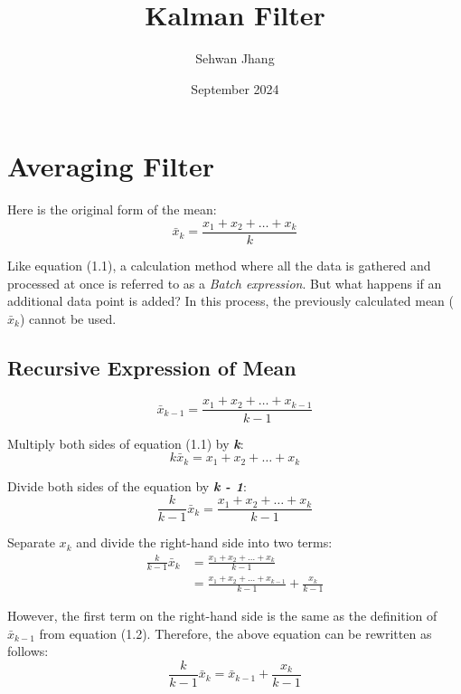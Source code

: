 \documentclass{article}
\title{Kalman Filter}
\author{Sehwan Jhang}
\date{September 2024}
\numberwithin{equation}{section} %
\begin{document}
\maketitle

\section{Averaging Filter}
Here is the original form of the mean:
\begin{equation}
    \bar{x}_k = \frac{x_1 + x_2 + \ldots + x_k}{k}
\end{equation}

Like equation (1.1), a calculation method where all the data is gathered and processed at once is referred to as a \textit{Batch expression}. But what happens if an additional data point is added? In this process, the previously calculated mean (\(\bar{x}_k\)) cannot be used.

\subsection{Recursive Expression of Mean}

\begin{equation}
    \bar{x}_{k-1} = \frac{x_1 + x_2 + \ldots + x_{k-1}}{k - 1}
\end{equation}

Multiply both sides of equation (1.1) by \textit{\textbf{k}}:
\begin{equation*}
    k \bar{x}_k = x_1 + x_2 + \ldots + x_k
\end{equation*}

Divide both sides of the equation by \textit{\textbf{k - 1}}:
\begin{equation*}
    \frac{k}{k-1} \bar{x}_k = \frac{x_1 + x_2 + \ldots + x_k}{k - 1}
\end{equation*}

Separate \( x_k \) and divide the right-hand side into two terms:
\begin{align*}
    \frac{k}{k-1} \bar{x}_k & = \frac{x_1 + x_2 + \ldots + x_k}{k - 1}                           \\
                            & = \frac{x_1 + x_2 + \ldots + x_{k - 1}}{k - 1} + \frac{x_k}{k - 1}
\end{align*}

However, the first term on the right-hand side is the same as the definition of \(\bar{x}_{k-1}\) from equation (1.2). Therefore, the above equation can be rewritten as follows:
\begin{equation}
    \frac{k}{k-1} \bar{x}_k = \bar{x}_{k-1} + \frac{x_k}{k - 1}
\end{equation}
\end{document}
